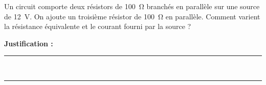 Un circuit comporte deux résistors de \qty{100}{\ohm} branchés en parallèle sur une source de \qty{12}{V}. On ajoute un troisième résistor de \qty{100}{\ohm} en parallèle. Comment varient la résistance équivalente et le courant fourni par la source ?

\choices

\noindent\textbf{Justification :} \hrulefill \\[2.5ex]
\rule{\linewidth}{0.4pt} \\[2.5ex]
\rule{\linewidth}{0.4pt}
\vfill
